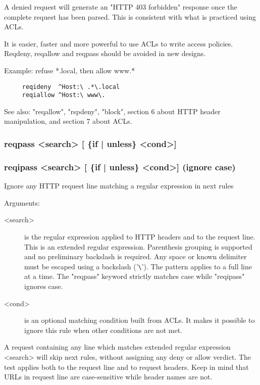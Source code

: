   A denied request will generate an "HTTP 403 forbidden" response once the
  complete request has been parsed. This is consistent with what is practiced
  using ACLs.

  It is easier, faster and more powerful to use ACLs to write access policies.
  Reqdeny, reqallow and reqpass should be avoided in new designs.

  Example: refuse *.local, then allow www.*
  
\begin{verbatim}
     reqideny  ^Host:\ .*\.local
     reqiallow ^Host:\ www\.
\end{verbatim}

  See also: "reqallow", "rspdeny", "block", section 6 about HTTP header
            manipulation, and section 7 about ACLs.

\subsubsection[reqpass]{reqpass  <search> [ \{if | unless\} <cond>] }
\subsubsection[reqipass]{reqipass <search> [ \{if | unless\} <cond>]  (ignore case) }


  Ignore any HTTP request line matching a regular expression in next rules


  Arguments:
  \begin{description}
  \item[<search>] is the regular expression applied to HTTP headers and to the
              request line. This is an extended regular expression. Parenthesis
              grouping is supported and no preliminary backslash is required.
              Any space or known delimiter must be escaped using a backslash
              ('\verb|\|'). The pattern applies to a full line at a time. The
              "reqpass" keyword strictly matches case while "reqipass" ignores
              case.

  \item[<cond>] is an optional matching condition built from ACLs. It makes it
              possible to ignore this rule when other conditions are not met.
  \end{description}

  A request containing any line which matches extended regular expression
  <search> will skip next rules, without assigning any deny or allow verdict.
  The test applies both to the request line and to request headers. Keep in
  mind that URLs in request line are case-sensitive while header names are not.


